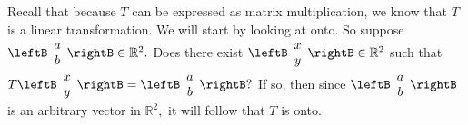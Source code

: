 \begin{solution} Recall that because $T$ can be expressed as matrix
multiplication, we know that $T$ is a linear transformation.  We will
start by looking at onto.  So suppose $\leftB
\begin{array}{c}
a \\
b
\end{array}
\rightB \in \mathbb{R}^{2}.$ Does there exist $\leftB
\begin{array}{c}
x \\
y
\end{array}
\rightB  \in \mathbb{R}^2 $ such that $T\leftB
\begin{array}{c}
x \\
y
\end{array}
\rightB =\leftB
\begin{array}{c}
a \\
b
\end{array}
\rightB ?$ If so, then since $\leftB
\begin{array}{c}
a \\
b
\end{array}
\rightB $ is an arbitrary vector in $\mathbb{R}^{2},$ it will follow that $T$
is onto. 


\end{solution}
